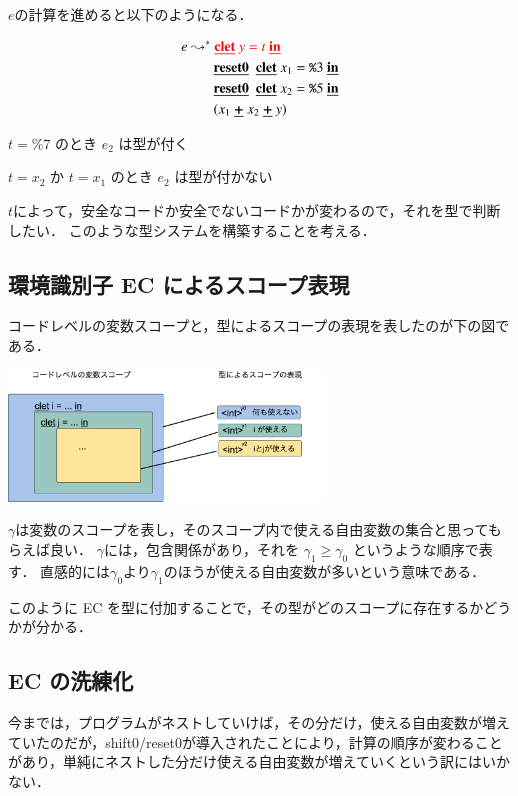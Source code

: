 \documentclass[10pt,a4j,twocolumn]{jarticle}
\newcommand\cResetz{\underline{\textbf{reset0}}}
\newcommand\cPlus{\underline{\textbf{+}}}
\newcommand\cLet{\underline{\textbf{clet}}}
\newcommand\cIn{\underline{\textbf{in}}}
\newcommand\csp[1]{\texttt{\%}{#1}}
\newcommand\ord{\ge}
\newcommand\too{\leadsto^*}
\newcommand\red[1]{\textcolor{red}{#1}}
\theoremstyle{definition}
\begin{document}
$e$の計算を進めると以下のようになる．

\begin{align*}
  e & \too \red{\cLet~y=t~\cIn} \\
    & \phantom{\too}~~ \cResetz ~~\cLet~x_1=\csp{3}~\cIn \\
    & \phantom{\too}~~ \cResetz ~~\cLet~x_2=\csp{5}~\cIn \\
    & \phantom{\too}~~ (x_1~\cPlus~x_2~\cPlus~y)
\end{align*}

$t=\csp{7}$ のとき $e_2$ は型が付く

$t=x_2$ か $t=x_1$ のとき $e_2$ は型が付かない

$t$によって，安全なコードか安全でないコードかが変わるので，それを型で判断したい．
このような型システムを構築することを考える．

\subsection{環境識別子 EC によるスコープ表現\cite{Sudo2014}}
コードレベルの変数スコープと，型によるスコープの表現を表したのが下の図である．

\begin{center}
  \includegraphics[clip,height=3.5cm]{../img/resume_ec.png}
\end{center}

$\gamma$は変数のスコープを表し，そのスコープ内で使える自由変数の集合と思ってもらえば良い．
$\gamma$には，包含関係があり，それを $\gamma_1 \ord \gamma_0$ というような順序で表す．
直感的には$\gamma_0$より$\gamma_1$のほうが使える自由変数が多いという意味である．

このように EC を型に付加することで，その型がどのスコープに存在するかどうかが分かる．

\subsection{EC の洗練化}
今までは，プログラムがネストしていけば，その分だけ，使える自由変数が増えていたのだが，shift0/reset0が導入されたことにより，計算の順序が変わることがあり，単純にネストした分だけ使える自由変数が増えていくという訳にはいかない．
\end{document}
